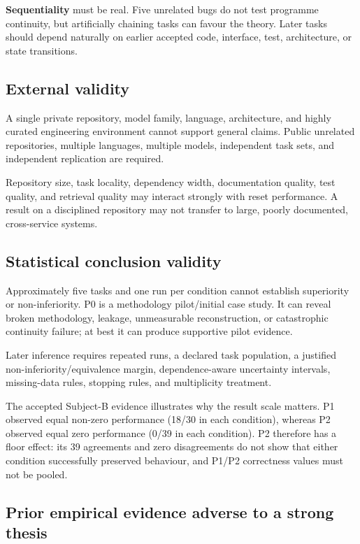 \textbf{Sequentiality} must be real. Five unrelated bugs do not test programme continuity, but artificially chaining tasks can favour the theory. Later tasks should depend naturally on earlier accepted code, interface, test, architecture, or state transitions.

\subsection{External validity}

A single private repository, model family, language, architecture, and highly curated engineering environment cannot support general claims. Public unrelated repositories, multiple languages, multiple models, independent task sets, and independent replication are required.

Repository size, task locality, dependency width, documentation quality, test quality, and retrieval quality may interact strongly with reset performance. A result on a disciplined repository may not transfer to large, poorly documented, cross-service systems.

\subsection{Statistical conclusion validity}

Approximately five tasks and one run per condition cannot establish superiority or non-inferiority. P0 is a methodology pilot/initial case study. It can reveal broken methodology, leakage, unmeasurable reconstruction, or catastrophic continuity failure; at best it can produce supportive pilot evidence.

Later inference requires repeated runs, a declared task population, a justified non-inferiority/equivalence margin, dependence-aware uncertainty intervals, missing-data rules, stopping rules, and multiplicity treatment.

The accepted Subject-B evidence illustrates why the result scale matters. P1 observed equal non-zero performance (18/30 in each condition), whereas P2 observed equal zero performance (0/39 in each condition). P2 therefore has a floor effect: its 39 agreements and zero disagreements do not show that either condition successfully preserved behaviour, and P1/P2 correctness values must not be pooled.

\subsection{Prior empirical evidence adverse to a strong thesis}

